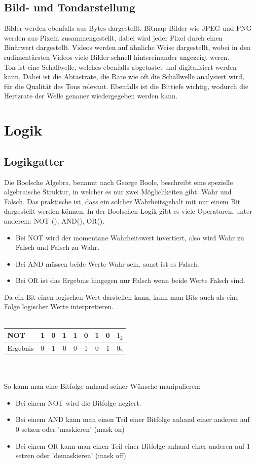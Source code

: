 \documentclass{article}
\begin{document}
		\subsection{Bild- und Tondarstellung}
		Bilder werden ebenfalls aus Bytes dargestellt. Bitmap Bilder wie JPEG und PNG werden aus Pixeln zusammengestellt, dabei wird jeder Pixel durch einen Binärwert dargestellt. Videos werden auf ähnliche Weise dargestellt, wobei in den rudimentärsten Videos viele Bilder schnell hintereinander angezeigt weren. \\
		Ton ist eine Schallwelle, welches ebenfalls abgetastet und digitalisiert werden kann. Dabei ist die Abtastrate, die Rate wie oft die Schallwelle analysiert wird, für die Qualität des Tons relevant. Ebenfalls ist die Bittiefe wichtig, wodurch die Hertzrate der Welle genauer wiedergegeben werden kann.
		\section{Logik}
		\subsection{Logikgatter}
		Die Boolsche Algebra, benannt nach George Boole, beschreibt eine spezielle algebraische Struktur, in welcher es nur zwei Möglichkeiten gibt: Wahr und Falsch. Das praktische ist, dass ein solcher Wahrheitsgehalt mit nur einem Bit dargestellt werden können. In der Boolschen Logik gibt es viele Operatoren, unter anderem: NOT (\neg), AND(\land), OR(\lor). \\
		\begin{itemize}
			\item{Bei NOT wird der momentane Wahrheitswert invertiert, also wird Wahr zu Falsch und Falsch zu Wahr.}
			\item{Bei AND müssen beide Werte Wahr sein, sonst ist es Falsch.}
			\item{Bei OR ist das Ergebnis hingegen nur Falsch wenn beide Werte Falsch sind.}
		\end{itemize}
		Da ein Bit einen logischen Wert darstellen kann, kann man Bits auch als eine Folge logischer Werte interpretieren. \\ \\
		\begin{tabular}{l|c|c|c|c|c|c|c|c}
			NOT&1&0&1&1&0&1&0&$1_2$ \\ \hline
			Ergebnis&0&1&0&0&1&0&1&$0_2$
		\end{tabular} \\ \\
		So kann man eine Bitfolge anhand seiner Wünsche manipulieren:
		\begin{itemize}
			\item{Bei einem NOT wird die Bitfolge negiert.}
			\item{Bei einem AND kann man einen Teil einer Bitfolge anhand einer anderen auf 0 setzen oder 'maskieren' (mask on)}
			\item{Bei einem OR kann man einen Teil einer Bitfolge anhand einer anderen auf 1 setzen oder 'demaskieren' (mask off)}
		\end{itemize}
\end{document}
